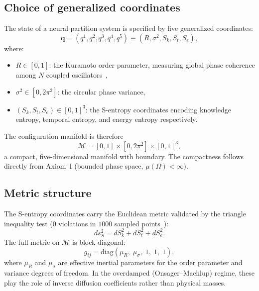 \documentclass[twocolumn,aps,prl,superscriptaddress,floatfix]{revtex4-2}
\newcommand{\Sk}{S_k}
\newcommand{\St}{S_t}
\newcommand{\Se}{S_e}
\newcommand{\qvec}{\mathbf{q}}
\begin{document}
\subsection{Choice of generalized coordinates}

The state of a neural partition system is specified by five generalized coordinates:
\begin{equation}
\qvec = (q^1, q^2, q^3, q^4, q^5) \equiv (R, \sigma^2, \Sk, \St, \Se),
\label{eq:gen_coords}
\end{equation}
where:
\begin{itemize}
    \item $R \in [0, 1]$: the Kuramoto order parameter, measuring global phase coherence among $N$ coupled oscillators~\cite{kuramoto1975},
    \item $\sigma^2 \in [0, 2\pi^2]$: the circular phase variance,
    \item $(\Sk, \St, \Se) \in [0, 1]^3$: the S-entropy coordinates encoding knowledge entropy, temporal entropy, and energy entropy respectively.
\end{itemize}

The configuration manifold is therefore
\begin{equation}
\mathcal{M} = [0,1] \times [0, 2\pi^2] \times [0,1]^3,
\end{equation}
a compact, five-dimensional manifold with boundary.
The compactness follows directly from Axiom~I (bounded phase space, $\mu(\Omega) < \infty$).

\subsection{Metric structure}

The S-entropy coordinates carry the Euclidean metric validated by the triangle inequality test ($0$ violations in $1000$ sampled points~\cite{sachikonye2026operator}):
\begin{equation}
ds^2_S = d\Sk^2 + d\St^2 + d\Se^2.
\end{equation}
The full metric on $\mathcal{M}$ is block-diagonal:
\begin{equation}
g_{ij} = \mathrm{diag}\!\left(\mu_R,\; \mu_\sigma,\; 1,\; 1,\; 1\right),
\label{eq:metric}
\end{equation}
where $\mu_R$ and $\mu_\sigma$ are effective inertial parameters for the order parameter and variance degrees of freedom.
In the overdamped (Onsager--Machlup) regime, these play the role of inverse diffusion coefficients rather than physical masses.
\end{document}
